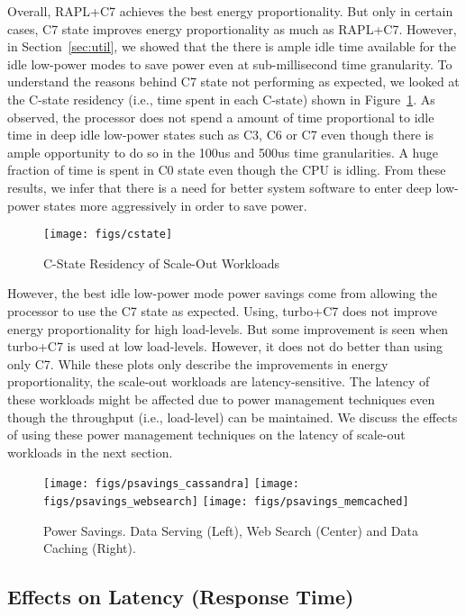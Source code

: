 \documentclass{sig-alternate}
\begin{document}
Overall, RAPL+C7 achieves the best energy proportionality. But only in certain cases, C7 
state improves energy proportionality as much as RAPL+C7. However, in Section~\ref{sec:util}, 
we showed that the there is ample idle time available for the idle low-power modes to save power 
even at sub-millisecond time granularity. To understand the reasons behind C7 state not performing as 
expected, we looked at the C-state residency (i.e., time spent in each C-state) shown in 
Figure~\ref{fig:cstateall}. As observed, the processor does not spend a amount of time 
proportional to idle time in deep idle low-power states such as C3, C6 or C7 even though there 
is ample opportunity to do so in the 100us and 500us time granularities. A huge fraction of 
time is spent in C0 state even though the CPU is idling. From these results, 
we infer that there is a need for better system software to enter deep low-power states more 
aggressively in order to save power. 

\begin{figure}[h]
\centering
\texttt{[image: figs/cstate]}
\caption{C-State Residency of Scale-Out Workloads}
\label{fig:cstateall}
\end{figure}

However, the best idle low-power mode 
power savings come from allowing the processor to use the C7 state as expected. Using, turbo+C7 
does not improve energy proportionality for high load-levels. But some improvement is seen when turbo+C7 
is used at low load-levels. However, it does not do better than using only C7. While these plots only 
describe the improvements in energy proportionality, the scale-out workloads are latency-sensitive. 
The latency of these workloads might be affected due to power management techniques even though 
the throughput (i.e., load-level) can be maintained. We discuss the effects of using these power 
management techniques on the latency of scale-out workloads in the next section.

\begin{figure*}[t]
\centering
\texttt{[image: figs/psavings\_cassandra]}
\texttt{[image: figs/psavings\_websearch]}
\texttt{[image: figs/psavings\_memcached]}
\caption{Power Savings. 
Data Serving (Left), Web Search (Center) and Data Caching (Right).}
\label{fig:psavings}
\end{figure*}
 

\subsection{Effects on Latency (Response Time)}
\end{document}
